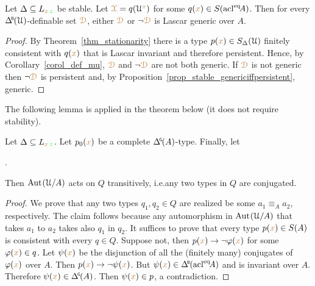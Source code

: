 \begin{corollary}\label{corol_stable_generic}
  Let $\Delta\subseteq L_{{\color{brown} x}\,{\color{green} z}}$ be stable.
  Let ${\color{brown}\EuScript X}=q(\EuScript U^{\color{brown} x})$ for some $q({\color{brown} x})\in S({\rm acl}^{{\rm eq}}\!A)$.
  Then for every $\BDelta(\U)$-definable set ${\color{brown}\EuScript D}$, either ${\color{brown}\EuScript D}$ or $\neg{\color{brown}\EuScript D}$ is Lascar generic over $A$.
\end{corollary}

\begin{proof}
  By Theorem~\ref{thm_stationarity} there is a type $p({\color{brown} x})\in S_\Delta(\EuScript U)$ finitely consistent with $q({\color{brown} x})$ that is Lascar invariant and therefore persistent.
  Hence, by Corollary~\ref{corol_def_mu}, ${\color{brown}\EuScript D}$ and $\neg{\color{brown}\EuScript D}$ are not both generic.
  If ${\color{brown}\EuScript D}$ is not generic then $\neg{\color{brown}\EuScript D}$ is persistent and, by Proposition~\ref{prop_stable_genericiffpersistent}, generic.
\end{proof}

The following lemma is applied in the theorem below (it does not require stability).

\begin{lemma}\label{lem_trans_action}
  Let $\Delta\subseteq L_{{\color{brown} x}\,{\color{green} z}}$.
  Let $p_0({\color{brown} x})$ be a complete $\GDelta(A)$-type.
  Finally, let 
  
  .
  
  Then ${\rm Aut\kern.15ex}(\EuScript U/A)$ acts on $Q$ transitively, i.e.\@ any two types in $Q$ are conjugated.
\end{lemma}

\begin{proof}
  We prove that any two types $q_1,q_2\in Q$ are realized be some $a_1\equiv_Aa_2$, respectively.
  The claim follows because any automorphism in ${\rm Aut\kern.15ex}(\EuScript U/A)$ that takes $a_1$ to $a_2$ takes also $q_1$ in $q_2$.
  It suffices to prove that every type $p({\color{brown} x})\in S(A)$ is consistent with every $q\in Q$.
  Suppose not, then $p({\color{brown} x})\rightarrow\neg\varphi({\color{brown} x})$ for some $\varphi({\color{brown} x})\in q$.
  Let $\psi({\color{brown} x})$ be the disjunction of all the (finitely many) conjugates of $\varphi({\color{brown} x})$ over $A$.
  Then $p({\color{brown} x})\rightarrow\neg\psi({\color{brown} x})$.
  But $\psi({\mr x})\in\BDelta(\acl^\eq\!A)$ and is invariant over $A$.
  Therefore $\psi({\mr x})\in\GDelta(A)$.
  Then $\psi({\color{brown} x})\in p$, a contradiction.
\end{proof}

